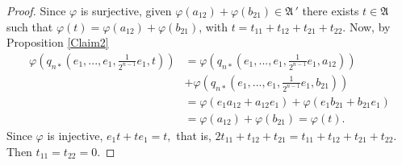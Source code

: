 \documentclass{amsart}
\def\A{{\mathfrak A}\, }
\begin{document}
\begin{proof}
Since $\varphi$ is surjective, given $\varphi(a_{12})+\varphi(b_{21}) \in \A'$ there exists $t \in \A$ such that 
$\varphi(t) = \varphi(a_{12})+\varphi(b_{21})$, with $t=t_{11}+t_{12}+t_{21}+t_{22}$. Now, by Proposition \ref{Claim2}
$$
\begin{aligned}
\varphi\left(q_{n*}\left(e_1,...,e_1,\frac{1}{2^{n-1}}e_1,t\right)\right) &= \varphi\left(q_{n*}\left(e_1,...,e_1,\frac{1}{2^{n-1}}e_1,a_{12}\right)\right) \\
& +\varphi\left(q_{n*}\left(e_1,...,e_1,\frac{1}{2^{n-1}}e_1,b_{21}\right)\right) \\ 
&= \varphi(e_1a_{12} + a_{12}e_1) + \varphi(e_1b_{21} + b_{21}e_1) \\
&= \varphi(a_{12}) + \varphi(b_{21}) = \varphi(t).
\end{aligned}
$$
Since $\varphi$ is injective, $e_1t + te_1 = t,$ that is,
$2t_{11} + t_{12} + t_{21} = t_{11}+t_{12}+t_{21}+t_{22}.
$ Then $t_{11} = t_{22} = 0$.







\end{proof}
\end{document}
